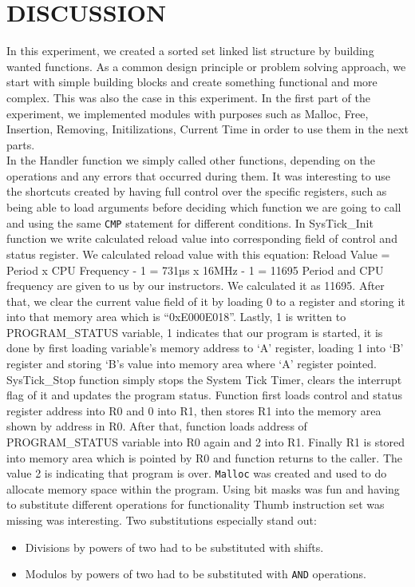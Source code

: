 \documentclass[pdftex,12pt,a4paper]{article}
\begin{document}
\section{DISCUSSION}
In this experiment, we created a sorted set linked list structure by building wanted functions. As a common design principle or problem solving approach, we start with simple building blocks and create something functional and more complex. This was also the case in this experiment. In the first part of the experiment, we implemented modules with purposes such as Malloc, Free, Insertion, Removing, Initilizations, Current Time in order to use them in the next parts.\\
In the Handler function we simply called other functions, depending on the operations and any errors that occurred during them. It was interesting to use the shortcuts created by having full control over the specific registers, such as being able to load arguments before deciding which function we are going to call and using the same \verb|CMP| statement for different conditions.
In SysTick\_Init function we write calculated reload value into corresponding field of control and status register. We calculated reload value with this equation:
Reload Value = Period x CPU Frequency - 1 = 731µs x 16MHz - 1 = 11695
Period and CPU frequency are given to us by our instructors. We calculated it as 11695.
After that, we clear the current value field of it by loading 0 to a register and storing it into that memory area which is “0xE000E018”.
Lastly, 1 is written to PROGRAM\_STATUS variable, 1 indicates that our program is started, it is done by first loading variable’s memory address to ‘A’ register, loading 1 into ‘B’ register and storing ‘B’s value into memory area where ‘A’ register pointed.
SysTick\_Stop function simply stops the System Tick Timer, clears the interrupt flag of it and updates the program status. Function first loads control and status register address into R0 and 0 into R1, then stores R1 into the memory area shown by address in R0. After that, function loads address of PROGRAM\_STATUS variable into R0 again and 2 into R1. Finally R1 is stored into memory area which is pointed by R0 and function returns to the caller. The value 2 is indicating that program is over.
\verb|Malloc| was created and used to do allocate memory space within the program. Using bit masks was fun and having to substitute different operations for functionality Thumb instruction set was missing was interesting. Two substitutions especially stand out:
\begin{itemize}
    \item Divisions by powers of two had to be substituted with shifts.
    \item Modulos by powers of two had to be substituted with \verb|AND| operations.
\end{itemize}
\end{document}
